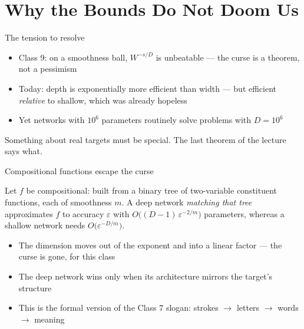 \documentclass[aspectratio=169, 11pt]{beamer}
\newcommand{\src}[3]{}      %
\newcommand{\nosrc}{}       %
\begin{document}
\section{Why the Bounds Do Not Doom Us}

\begin{frame}{The tension to resolve}
  \nosrc
  \vspace{0.3em}
  \begin{itemize}\setlength{\itemsep}{5pt}
    \item Class 9: on a smoothness ball, $W^{-s/D}$ is
          \alert{unbeatable} --- the curse is a theorem, not a
          pessimism
    \item Today: depth is exponentially more efficient than width ---
          but efficient \emph{relative} to shallow, which was already
          hopeless
    \item Yet networks with $10^{6}$ parameters routinely solve
          problems with $D=10^{6}$
  \end{itemize}
  \vspace{0.5em}
  \begin{redhighlight}
    Something about \alert{real targets} must be special. The last
    theorem of the lecture says what.
  \end{redhighlight}
\end{frame}

\begin{frame}{Compositional functions escape the curse}
  \src{poggio2017}{section}{3.4}
  \src{poggio2017}{section}{3.3}
  \vspace{0.2em}
  \begin{theorem}
    {\small Let $f$ be \alert{compositional}: built from a binary tree
    of two-variable constituent functions, each of smoothness $m$. A
    deep network \emph{matching that tree} approximates $f$ to accuracy
    $\varepsilon$ with
    $O\big((D-1)\,\varepsilon^{-2/m}\big)$ parameters, whereas a
    shallow network needs $O\big(\varepsilon^{-D/m}\big)$.}
  \end{theorem}
  \vspace{0.4em}
  {\small
  \begin{itemize}\setlength{\itemsep}{3pt}
    \item The dimension moves out of the \alert{exponent} and into a
          \alert{linear factor} --- the curse is gone, for this class
    \item The deep network wins only when its \alert{architecture
          mirrors the target's structure}
    \item This is the formal version of the Class 7 slogan: strokes
          $\to$ letters $\to$ words $\to$ meaning
  \end{itemize}}
\end{frame}
\end{document}
